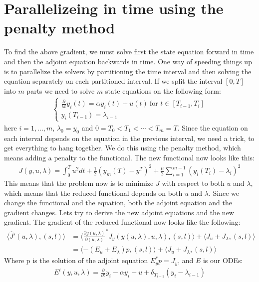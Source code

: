 \documentclass[11pt,a4paper]{article}
\begin{document}
\section*{Parallelizeing in time using the penalty method}
To find the above gradient, we must solve first the state equation forward in time and then the adjoint equation backwards in time. One way of speeding things up is to parallelize the solvers by partitioning the time interval and then solving the equation separately on each partitioned interval. If we split the interval $[0,T]$ into $m$ parts we need to solve $m$ state equations on the following form:
\begin{align*}
   \left\{
     \begin{array}{lr}
       \frac{\partial }{\partial t} y_i(t) = \alpha y_i(t) + u(t) \ \text{for $t \in [T_{i-1},T_{i}]$}\\
	y_i(T_{i-1}) = \lambda_{i-1}
     \end{array}
   \right.
\end{align*}
here $i=1,...,m$, $\lambda_0=y_0$ and $0=T_0<T_1<\cdots<T_{m}=T$. Since the equation on each interval depends on the equation in the previous interval, we need a trick, to get everything to hang together. We do this using the penalty method, which means adding a penalty to the functional. The new functional now looks like this:
\begin{align*}
J(y,u,\lambda) = \int_0^T u^2 dt + \frac{1}{2}(y_m(T)-y^T)^2 + \frac{\mu}{2} \sum_{i=1}^{m-1} (y_{i}(T_i)-\lambda_i)^2 
\end{align*}
This means that the problem now is to minimize $J$ with respect to both $u$ and $\lambda$, which means that the reduced functional depends on both $u$ and $\lambda$. Since we change the functional and the equation, both the adjoint equation and the gradient changes. Lets try to derive the new adjoint equations and the new gradient. The gradient of the reduced functional now looks like the following:
\begin{align*}
\langle \hat{J}'(u,\lambda), (s,l)\rangle &= \langle \frac{\partial y(u,\lambda)}{\partial(u,\lambda)}^* J_y(y(u,\lambda),u,\lambda), (s,l)\rangle + \langle J_u+J_{\lambda}, (s,l)\rangle \\
&=\langle -(E_u+E_{\lambda})p , (s,l)\rangle + \langle J_u+J_{\lambda}, (s,l)\rangle
\end{align*} 
Where p is the solution of the adjoint equation $E_y^*p=J_y$, and $E$ is our ODEs:
\begin{align*}
E^i(y,u,\lambda)= \frac{\partial }{\partial t} y_i - \alpha y_i -u+ \delta_{T_{i-1}}(y_i-\lambda_{i-1})
\end{align*} 
\end{document}
